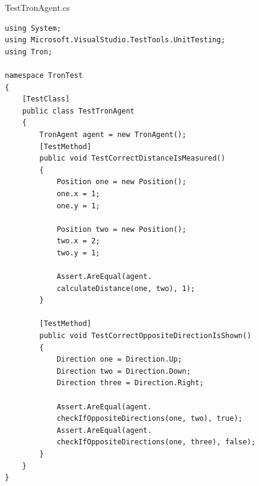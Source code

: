 \documentclass[12pt,a4paper]{article}
\begin{document}
TestTronAgent.cs
\begin{lstlisting}
using System;
using Microsoft.VisualStudio.TestTools.UnitTesting;
using Tron;

namespace TronTest
{
	[TestClass]
	public class TestTronAgent
	{
		TronAgent agent = new TronAgent();
		[TestMethod]
		public void TestCorrectDistanceIsMeasured()
		{
			Position one = new Position();
			one.x = 1;
			one.y = 1;

			Position two = new Position();
			two.x = 2;
			two.y = 1;

			Assert.AreEqual(agent.
			calculateDistance(one, two), 1);
		}

		[TestMethod]
		public void TestCorrectOppositeDirectionIsShown()
		{
			Direction one = Direction.Up;
			Direction two = Direction.Down;
			Direction three = Direction.Right;

			Assert.AreEqual(agent.
			checkIfOppositeDirections(one, two), true);
			Assert.AreEqual(agent.
			checkIfOppositeDirections(one, three), false);
		}
	}
}

\end{lstlisting}
\end{document}
